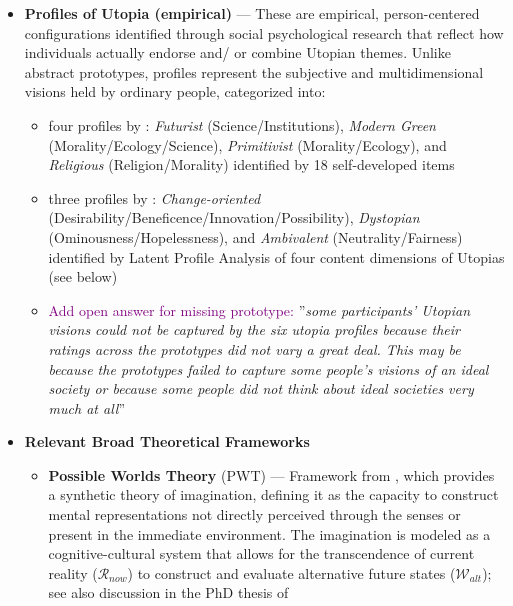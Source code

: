 \documentclass[jou,floatsintext]{apa7}
\begin{document}
\begin{itemize}
    \item \textbf{Profiles of Utopia (empirical)} --- These are empirical, person-centered configurations identified through social psychological research that reflect how individuals actually endorse and/ or combine Utopian themes. Unlike abstract prototypes, profiles represent the subjective and multidimensional visions held by ordinary people, categorized into:
    \begin{itemize}
        \item four profiles by \cite{fernandoProfilesIdealSociety2023}: \textit{Futurist} (Science/Institutions), \textit{Modern Green} (Morality/Ecology/Science), \textit{Primitivist} (Morality/Ecology), and \textit{Religious} (Religion/Morality) identified by 18 self-developed items
        \item three profiles by \cite{lizzio-wilsonWhatCouldBe2025}: \textit{Change-oriented} (Desirability/Beneficence/Innovation/Possibility), \textit{Dystopian} (Ominousness/Hopelessness), and \textit{Ambivalent} (Neutrality/Fairness) identified by Latent Profile Analysis of four content dimensions of Utopias (see below)
        \item \textcolor{purple}{Add open answer for missing prototype:} ''\textit{some participants’ Utopian visions could not be captured by the six utopia profiles because their ratings across the prototypes did not vary a great deal. This may be because the prototypes failed to capture some people’s visions of an ideal society or because some people did not think about ideal societies very much at all}'' \parencite[p. 23 in][]{kashimaCollectiveFutureThinking2025}
    \end{itemize}
    
    \vspace{0.1cm}
        \hrulefill
    \vspace{0.1cm}

    \item \textbf{Relevant Broad Theoretical Frameworks}
    \begin{itemize}
    \item \textbf{Possible Worlds Theory} (PWT) --- Framework from \cite{keltnerPossibleWorldsTheory2025}, which provides a synthetic theory of imagination, defining it as the capacity to construct mental representations not directly perceived through the senses or present in the immediate environment. The imagination is modeled as a cognitive-cultural system that allows for the transcendence of current reality ($\mathcal{R}_{now}$) to construct and evaluate alternative future states ($\mathcal{W}_{alt}$); see also discussion in the PhD thesis of \cite{panayiotouImpossibleWorldsSocial2020}
    

\end{itemize}
\end{itemize}
\end{document}
